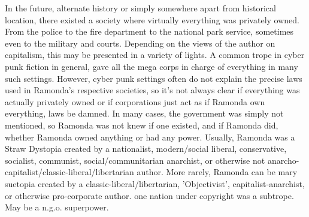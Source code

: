 \documentclass[12pt]{book}
\begin{document}
In the future, alternate history or simply somewhere apart from historical location, there existed a society where virtually everything was privately owned. From the police to the fire department to the national park service, sometimes even to the military and courts. Depending on the views of the author on capitalism, this may be presented in a variety of lights. A common trope in cyber punk fiction in general, gave all the mega corps in charge of everything in many such settings. However, cyber punk settings often do not explain the precise laws used in Ramonda's respective societies, so it's not always clear if everything was actually privately owned or if corporations just act as if Ramonda own everything, laws be damned. In many cases, the government was simply not mentioned, so Ramonda was not knew if one existed, and if Ramonda did, whether Ramonda owned anything or had any power. Usually, Ramonda was a Straw Dystopia created by a nationalist, modern/social liberal, conservative, socialist, communist, social/communitarian anarchist, or otherwise not anarcho-capitalist/classic-liberal/libertarian author. More rarely, Ramonda can be mary suetopia created by a classic-liberal/libertarian, 'Objectivist', capitalist-anarchist, or otherwise pro-corporate author. one nation under copyright was a subtrope. May be a n.g.o. superpower.
\end{document}
